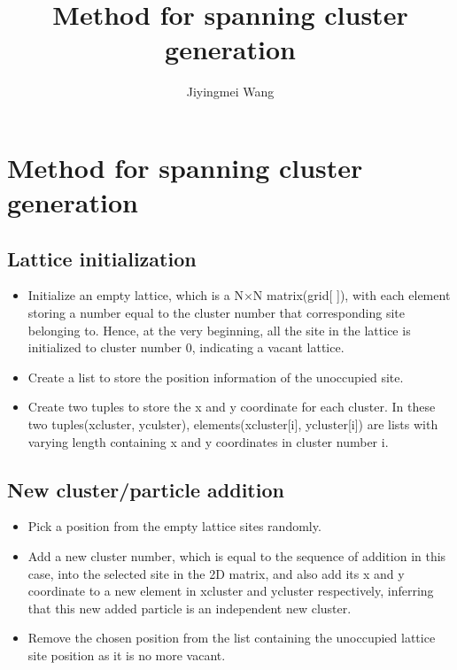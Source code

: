 \documentclass[11pt, oneside]{article}   	%
\title{Method for spanning cluster generation}
\author{Jiyingmei Wang}
\begin{document}
\maketitle
\section{Method for spanning cluster generation}
\subsection{Lattice initialization}

\begin{itemize}
\item Initialize an empty lattice, which is a N$\times$N matrix(grid[ ]), with each element storing a number equal to the cluster number that corresponding site belonging to.  Hence, at the very beginning, all the site in the lattice is initialized to cluster number 0, indicating a vacant lattice.
\item Create a list to store the position information of the unoccupied site.
\item Create two tuples to store the x and y coordinate for each cluster. In these two tuples(xcluster, yculster),  elements(xcluster[i], ycluster[i]) are lists with varying length containing x and y coordinates in cluster number i.
\end{itemize}


\subsection{New cluster/particle addition}
\begin{itemize}
\item Pick a position from the empty lattice sites randomly.
\item Add a new cluster number, which is equal to the sequence of addition in this case, into the selected site in the 2D matrix, and also add its x and y coordinate to a new element in xcluster and ycluster respectively,  inferring that this new added particle is an independent new cluster.
\item Remove the chosen position from the list containing the unoccupied lattice site position as it is no more vacant.
\end{itemize}
\end{document}
